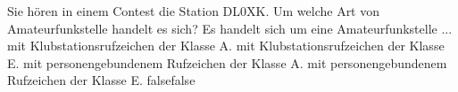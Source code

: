     {Sie hören in einem Contest die Station DL0XK. Um welche Art von Amateurfunkstelle handelt es sich? Es handelt sich um eine Amateurfunkstelle ...}
    {mit Klubstationsrufzeichen der Klasse A.}
    {mit Klubstationsrufzeichen der Klasse E.}
    {mit personengebundenem Rufzeichen der Klasse A.}
    {mit personengebundenem Rufzeichen der Klasse E.}
    {false}{false}